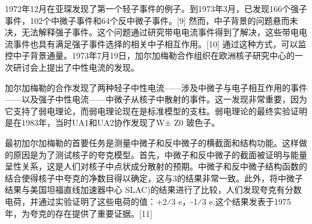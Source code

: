 1972年12月在亚琛发现了第一个轻子事件的例子。到1973年3月，已发现166个强子事件，102个中微子事件和64个反中微子事件。[9] 然而，中子背景的问题悬而未决，无法解释强子事件。这个问题通过研究带电电流事件得到了解决，这些带电电流事件也具有满足强子事件选择的相关中子相互作用。[10] 通过这种方式，可以监控中子背景通量。1973年7月19日，加尔加梅勒合作组织在欧洲核子研究中心的一次研讨会上提出了中性电流的发现。

加尔加梅勒的合作发现了两种轻子中性电流——涉及中微子与电子相互作用的事件——以及强子中性电流——中微子从核子中散射的事件。这一发现非常重要，因为它支持了弱电理论，而弱电理论现在是标准模型的支柱。弱电理论的最终实验证明是在1983年，当时UA1和UA2协作发现了W± Z0 玻色子。

最初加尔加梅勒的首要任务是测量中微子和反中微子的横截面和结构功能。这样做的原因是为了测试核子的夸克模型。首先，中微子和反中微子的截面被证明与能量呈性关系，这是人们对核子中点状成分散射的预期。中微子和反中微子结构函数的结合使得核子中夸克的净数目得以确定，这与3的结果非常一致。此外，将中微子结果与美国坦福直线加速器中心 SLAC)的结果进行了比较，人们发现夸克有分数电荷，并通过实验证明了这些电荷的值：+2⁄3 e，-1⁄3 e.这个结果发表于1975年，为夸克的存在提供了重要证据。[11]